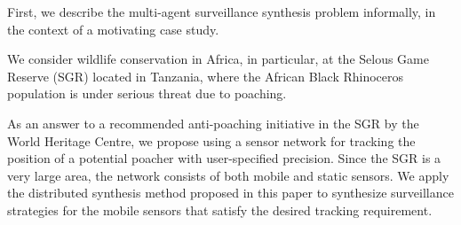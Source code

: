 First, we describe the multi-agent surveillance synthesis problem informally, in the context of a motivating case study. 

We consider wildlife conservation in Africa, in particular, at the Selous Game Reserve (SGR) located in Tanzania, where the African Black Rhinoceros population is under serious threat due to poaching. 

As an answer to a recommended anti-poaching initiative in the SGR by the World Heritage Centre,  we propose using a sensor network for tracking the position of a potential poacher  with user-specified precision. Since the SGR is a very large area, the network consists of both mobile and static sensors. We apply the  distributed synthesis method proposed in this paper to synthesize surveillance strategies for the mobile sensors that satisfy the desired tracking requirement.


